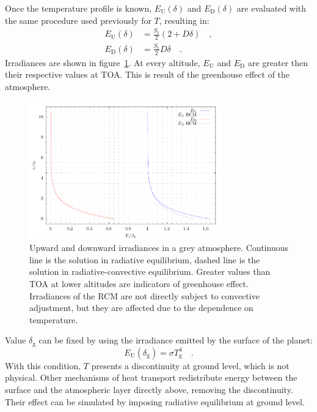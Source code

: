 \documentclass[a4paper,10pt,twocolumn,\classoptions]{article}
\begin{document}
Once the temperature profile is known, $E_\text{U}(\delta)$ and $E_\text{D}(\delta)$ are evaluated with the same procedure used previously for $T$, resulting in:
\begin{align}
  \label{eq:irradiance_upward_solution}
  E_\text{U}(\delta) & = \frac{S_\text{t}}{2} (2 + D \delta) \quad , \\
  \label{eq:irradiance_downward_solution}
  E_\text{D}(\delta) & = \frac{S_\text{t}}{2} D \delta
  \quad .
\end{align}
Irradiances are shown in figure~\ref{fig:irradiance}. At every altitude, $E_\text{U}$ and $E_\text{D}$ are greater then their respective values at TOA. This is result of the greenhouse effect of the atmosphere.
\begin{figure}[h]
  \centering
  \includegraphics*[keepaspectratio=true,width=0.75\textwidth]{irradiance}
  \caption{Upward and downward irradiances in a grey atmosphere. Continuous line is the solution in radiative equilibrium, dashed line is the solution in radiative-convective equilibrium. Greater values than TOA at lower altitudes are indicators of greenhouse effect. Irradiances of the RCM are not directly subject to convective adjustment, but they are affected due to the dependence on temperature.}
  \label{fig:irradiance}
\end{figure}

Value $\delta_\text{g}$ can be fixed by using the irradiance emitted by the surface of the planet:
\begin{equation}
  \label{eq:irradiance_upward_ground}
  E_\text{U}(\delta_\text{g}) = \sigma T_\text{g}^4
  \quad .
\end{equation}
With this condition, $T$ presents a discontinuity at ground level, which is not physical. Other mechanisms of heat transport redistribute energy between the surface and the atmospheric layer directly above, removing the discontinuity. Their effect can be simulated by imposing radiative equilibrium at ground level.
\end{document}
